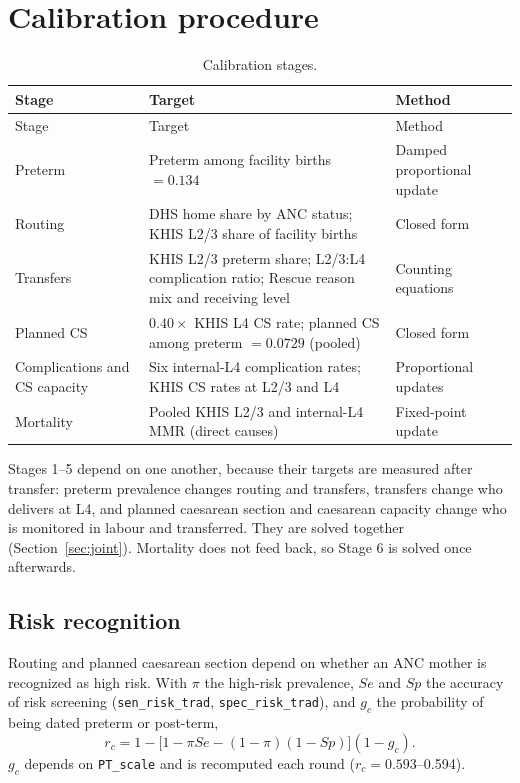 \documentclass[11pt]{article}
\newcommand{\p}[1]{\texttt{#1}}
\begin{document}
\section{Calibration procedure}

\begin{longtable}{>{\raggedright\arraybackslash}p{} >{\raggedright\arraybackslash}p{} >{\raggedright\arraybackslash}p{}}
\caption{Calibration stages.}\label{tab:stages}\\
\toprule
Stage & Target & Method \\
\midrule
\endfirsthead
\toprule
Stage & Target & Method \\
\midrule
\endhead
1 Preterm & Preterm among facility births $=0.134$ & Damped proportional update \\
2 Routing & DHS home share by ANC status; KHIS L2/3 share of facility births & Closed form \\
3 Transfers & KHIS L2/3 preterm share; L2/3:L4 complication ratio; Rescue reason mix and receiving level & Counting equations \\
4 Planned CS & $0.40\times$ KHIS L4 CS rate; planned CS among preterm $=0.0729$ (pooled) & Closed form \\
5 Complications and CS capacity & Six internal-L4 complication rates; KHIS CS rates at L2/3 and L4 & Proportional updates \\
6 Mortality & Pooled KHIS L2/3 and internal-L4 MMR (direct causes) & Fixed-point update \\
\bottomrule
\end{longtable}

Stages 1--5 depend on one another, because their targets are measured after
transfer: preterm prevalence changes routing and transfers, transfers change who
delivers at L4, and planned caesarean section and caesarean capacity change who
is monitored in labour and transferred. They are solved together
(Section~\ref{sec:joint}). Mortality does not feed back, so Stage 6 is solved
once afterwards.

\subsection{Risk recognition}

Routing and planned caesarean section depend on whether an ANC mother is
recognized as high risk. With $\pi$ the high-risk prevalence, $Se$ and $Sp$ the
accuracy of risk screening (\p{sen\_risk\_trad}, \p{spec\_risk\_trad}), and
$g_c$ the probability of being dated preterm or post-term,
\begin{equation}
r_c=1-\bigl[1-\pi Se-(1-\pi)(1-Sp)\bigr](1-g_c).
\end{equation}
$g_c$ depends on \p{PT\_scale} and is recomputed each round ($r_c=0.593$--0.594).
\end{document}
